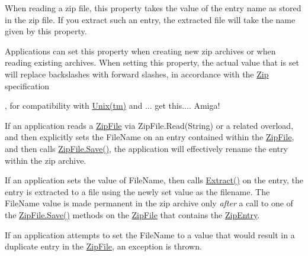 When reading a zip file, this property takes the value of the entry name as stored in the zip file. If you extract such an entry, the extracted file will take the name given by this property. 

Applications can set this property when creating new zip archives or when reading existing archives. When setting this property, the actual value that is set will replace backslashes with forward slashes, in accordance with the \mbox{\hyperlink{namespace_super_tiled2_unity_1_1_ionic_1_1_zip}{Zip}} specification

, for compatibility with \mbox{\hyperlink{namespace_super_tiled2_unity_1_1_ionic_1_1_zip_afa5034d6b4915c0633b590a28622f7fda6ec1bd1ea6a5d67a63b20c8f6172bddd}{Unix(tm)}} and ... get this.... Amiga! 

If an application reads a {\ttfamily \mbox{\hyperlink{class_super_tiled2_unity_1_1_ionic_1_1_zip_1_1_zip_file}{Zip\+File}}} via Zip\+File.\+Read(\+String) or a related overload, and then explicitly sets the File\+Name on an entry contained within the {\ttfamily \mbox{\hyperlink{class_super_tiled2_unity_1_1_ionic_1_1_zip_1_1_zip_file}{Zip\+File}}}, and then calls \mbox{\hyperlink{class_super_tiled2_unity_1_1_ionic_1_1_zip_1_1_zip_file_aff8f1b3d07b66481e2629b04017a056f}{Zip\+File.\+Save()}}, the application will effectively rename the entry within the zip archive. 

If an application sets the value of {\ttfamily File\+Name}, then calls {\ttfamily \mbox{\hyperlink{class_super_tiled2_unity_1_1_ionic_1_1_zip_1_1_zip_entry_a9d65543aadd23e47e188175412891b42}{Extract()}}} on the entry, the entry is extracted to a file using the newly set value as the filename. The {\ttfamily File\+Name} value is made permanent in the zip archive only {\itshape after} a call to one of the {\ttfamily \mbox{\hyperlink{class_super_tiled2_unity_1_1_ionic_1_1_zip_1_1_zip_file_aff8f1b3d07b66481e2629b04017a056f}{Zip\+File.\+Save()}}} methods on the {\ttfamily \mbox{\hyperlink{class_super_tiled2_unity_1_1_ionic_1_1_zip_1_1_zip_file}{Zip\+File}}} that contains the \mbox{\hyperlink{class_super_tiled2_unity_1_1_ionic_1_1_zip_1_1_zip_entry}{Zip\+Entry}}. 

If an application attempts to set the {\ttfamily File\+Name} to a value that would result in a duplicate entry in the {\ttfamily \mbox{\hyperlink{class_super_tiled2_unity_1_1_ionic_1_1_zip_1_1_zip_file}{Zip\+File}}}, an exception is thrown. 

